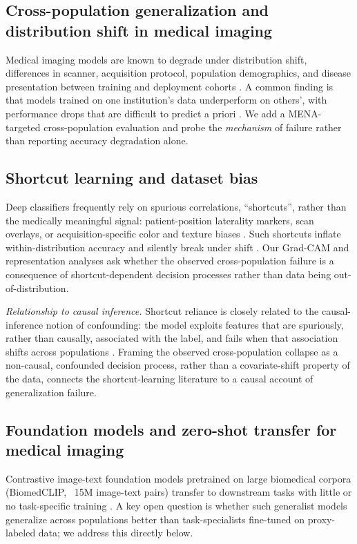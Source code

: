 \documentclass[runningheads]{llncs}
\begin{document}
\subsection{Cross-population generalization and distribution shift in medical imaging}
Medical imaging models are known to degrade under distribution shift, differences in scanner, acquisition protocol, population demographics, and disease presentation between training and deployment cohorts \cite{su2024}. A common finding is that models trained on one institution's data underperform on others', with performance drops that are difficult to predict a priori \cite{rajpurkar2020}. We add a MENA-targeted cross-population evaluation and probe the \emph{mechanism} of failure rather than reporting accuracy degradation alone.

\subsection{Shortcut learning and dataset bias}
Deep classifiers frequently rely on spurious correlations, ``shortcuts'', rather than the medically meaningful signal: patient-position laterality markers, scan overlays, or acquisition-specific color and texture biases \cite{geirhos2020,zech2018}. Such shortcuts inflate within-distribution accuracy and silently break under shift \cite{geirhos2020}. Our Grad-CAM and representation analyses ask whether the observed cross-population failure is a consequence of shortcut-dependent decision processes rather than data being out-of-distribution.

\emph{Relationship to causal inference.} Shortcut reliance is closely related to the causal-inference notion of confounding: the model exploits features that are spuriously, rather than causally, associated with the label, and fails when that association shifts across populations \cite{pearl2009}. Framing the observed cross-population collapse as a non-causal, confounded decision process, rather than a covariate-shift property of the data, connects the shortcut-learning literature to a causal account of generalization failure.

\subsection{Foundation models and zero-shot transfer for medical imaging}
Contrastive image-text foundation models pretrained on large biomedical corpora (BiomedCLIP, ~15M image-text pairs) transfer to downstream tasks with little or no task-specific training \cite{zhang2023}. A key open question is whether such generalist models generalize across populations better than task-specialists fine-tuned on proxy-labeled data; we address this directly below.
\end{document}

